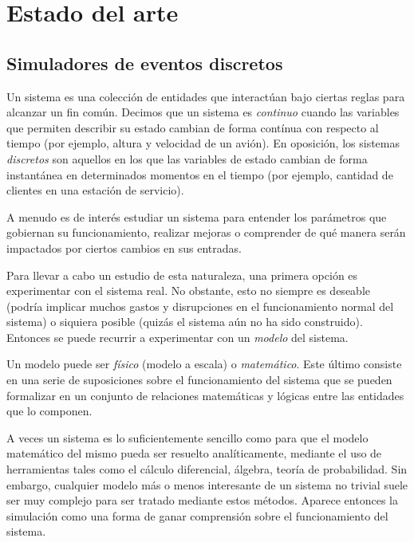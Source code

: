 \chapter{Estado del arte}\label{sec:eda}

\section{Simuladores de eventos discretos}

Un sistema es una colección de entidades que interactúan bajo ciertas reglas
para alcanzar un fin común. Decimos que un sistema es \textit{continuo} cuando
las variables que permiten describir su estado cambian de forma contínua con
respecto al tiempo (por ejemplo, altura y velocidad de un avión). En oposición,
los sistemas \textit{discretos} son aquellos en los que las variables de estado
cambian de forma instantánea en determinados momentos en el tiempo (por
ejemplo, cantidad de clientes en una estación de servicio).

A menudo es de interés estudiar un sistema para entender los parámetros que
gobiernan su funcionamiento, realizar mejoras o comprender de qué manera serán
impactados por ciertos cambios en sus entradas.

Para llevar a cabo un estudio de esta naturaleza, una primera opción es
experimentar con el sistema real. No obstante, esto no siempre es deseable
(podría implicar muchos gastos y disrupciones en el funcionamiento normal del
sistema) o siquiera posible (quizás el sistema aún no ha sido construido).
Entonces se puede recurrir a experimentar con un \textit{modelo} del sistema.

Un modelo puede ser \textit{físico} (modelo a escala) o \textit{matemático}.
Este último consiste en una serie de suposiciones sobre el funcionamiento del
sistema que se pueden formalizar en un conjunto de relaciones matemáticas y
lógicas entre las entidades que lo componen.

A veces un sistema es lo suficientemente sencillo como para que el modelo
matemático del mismo pueda ser resuelto analíticamente, mediante el uso de
herramientas tales como el cálculo diferencial, álgebra, teoría de
probabilidad. Sin embargo, cualquier modelo más o menos interesante de un
sistema no trivial suele ser muy complejo para ser tratado mediante estos
métodos. Aparece entonces la simulación como una forma de ganar comprensión
sobre el funcionamiento del sistema.


